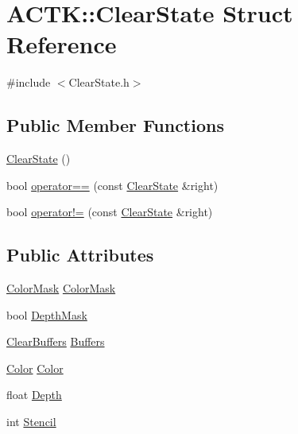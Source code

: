 \hypertarget{struct_a_c_t_k_1_1_clear_state}{\section{A\-C\-T\-K\-:\-:Clear\-State Struct Reference}
\label{struct_a_c_t_k_1_1_clear_state}
}


{\ttfamily \#include $<$Clear\-State.\-h$>$}

\subsection*{Public Member Functions}
\begin{DoxyCompactItemize}
\item 
\hyperlink{struct_a_c_t_k_1_1_clear_state_a3931e61d9662e1268c5e042518100340}{Clear\-State} ()
\item 
bool \hyperlink{struct_a_c_t_k_1_1_clear_state_a4798de8ee59fb8d0d91b867760c77fb8}{operator==} (const \hyperlink{struct_a_c_t_k_1_1_clear_state}{Clear\-State} \&right)
\item 
bool \hyperlink{struct_a_c_t_k_1_1_clear_state_ab13fc63ba272b07bbdb857d5454754e9}{operator!=} (const \hyperlink{struct_a_c_t_k_1_1_clear_state}{Clear\-State} \&right)
\end{DoxyCompactItemize}
\subsection*{Public Attributes}
\begin{DoxyCompactItemize}
\item 
\hyperlink{struct_a_c_t_k_1_1_color_mask}{Color\-Mask} \hyperlink{struct_a_c_t_k_1_1_clear_state_a5a50a81a2a4e509dfc145525e6ee5fc4}{Color\-Mask}
\item 
bool \hyperlink{struct_a_c_t_k_1_1_clear_state_a818d3e6ff82c541ebe2b9c2eb80c04c4}{Depth\-Mask}
\item 
\hyperlink{namespace_a_c_t_k_ac7a4b20bfb9290a45d05a8086fd0e81e}{Clear\-Buffers} \hyperlink{struct_a_c_t_k_1_1_clear_state_a48fd03a966c5cb872483398dbe03c393}{Buffers}
\item 
\hyperlink{struct_a_c_t_k_1_1_color}{Color} \hyperlink{struct_a_c_t_k_1_1_clear_state_a4dd7cac4c4a8256a268ff2f61776e869}{Color}
\item 
float \hyperlink{struct_a_c_t_k_1_1_clear_state_a02b345a3bfcbfbe52659ffb53ae340a7}{Depth}
\item 
int \hyperlink{struct_a_c_t_k_1_1_clear_state_a6ccd42a6540bacd267cff6566b4cfa10}{Stencil}
\end{DoxyCompactItemize}


